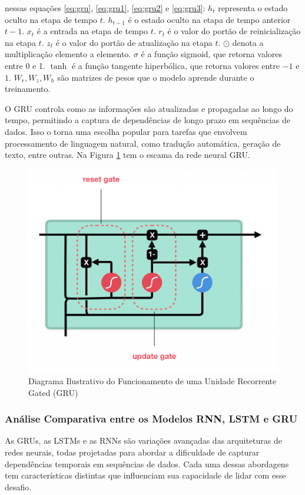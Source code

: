 \noindent nessas equações \eqref{eq:gru}, \eqref{eq:gru1}, \eqref{eq:gru2} e \eqref{eq:gru3}:
 \( h_t \) representa o estado oculto na etapa de tempo \( t \). \( h_{t-1} \) é o estado oculto na etapa de tempo anterior \( t-1 \). \( x_t \) é a entrada na etapa de tempo \( t \). \( r_t \) é o valor do portão de reinicialização na etapa \( t \). \( z_t \) é o valor do portão de atualização na etapa \( t \). \( \odot \) denota a multiplicação elemento a elemento. \( \sigma \) é a função sigmoid, que retorna valores entre 0 e 1. \( \tanh \) é a função tangente hiperbólica, que retorna valores entre $-1$ e $1$. \( W_r, W_z, W_h \) são matrizes de pesos que o modelo aprende durante o treinamento.

O GRU controla como as informações são atualizadas e propagadas ao longo do tempo, permitindo a captura de dependências de longo prazo em sequências de dados. Isso o torna uma escolha popular para tarefas que envolvem processamento de linguagem natural, como tradução automática, geração de texto, entre outras.
Na Figura \ref{fig:gru4-1024x835} tem o escama da rede neural GRU.

\begin{figure}[H]
	\centering
	\caption{Diagrama Ilustrativo do Funcionamento de uma Unidade Recorrente Gated (GRU)}
	\label{fig:gru4-1024x835}
	\includegraphics[width=0.5\linewidth]{Apendices/Figuras/modelagem-24h/gru4-1024x835}
	
\end{figure}



\subsubsection{An\'alise Comparativa entre os Modelos RNN, LSTM e GRU}

As GRUs, as LSTMs e as RNNs são variações avançadas das arquiteturas de redes neurais, todas projetadas para abordar a dificuldade de capturar dependências temporais em sequências de dados. Cada uma dessas abordagens tem características distintas que influenciam sua capacidade de lidar com esse desafio.

